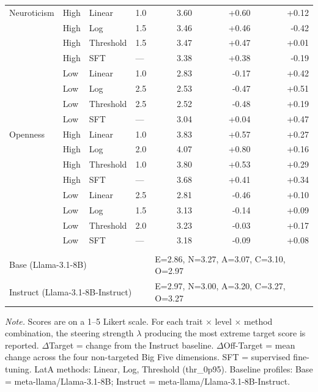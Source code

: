 \begin{table}[htbp]
\begin{threeparttable}
\begin{tabular}{llllrrr}
\addlinespace
  Neuroticism & High & Linear & 1.0 & 3.60 & +0.60 & +0.12 \\
   & High & Log & 1.5 & 3.46 & +0.46 & -0.42 \\
   & High & Threshold & 1.5 & 3.47 & +0.47 & +0.01 \\
   & High & SFT & — & 3.38 & +0.38 & -0.19 \\
   & Low & Linear & 1.0 & 2.83 & -0.17 & +0.42 \\
   & Low & Log & 2.5 & 2.53 & -0.47 & +0.51 \\
   & Low & Threshold & 2.5 & 2.52 & -0.48 & +0.19 \\
   & Low & SFT & — & 3.04 & +0.04 & +0.47 \\
\addlinespace
  Openness & High & Linear & 1.0 & 3.83 & +0.57 & +0.27 \\
   & High & Log & 2.0 & 4.07 & +0.80 & +0.16 \\
   & High & Threshold & 1.0 & 3.80 & +0.53 & +0.29 \\
   & High & SFT & — & 3.68 & +0.41 & +0.34 \\
   & Low & Linear & 2.5 & 2.81 & -0.46 & +0.10 \\
   & Low & Log & 1.5 & 3.13 & -0.14 & +0.09 \\
   & Low & Threshold & 2.0 & 3.23 & -0.03 & +0.17 \\
   & Low & SFT & — & 3.18 & -0.09 & +0.08 \\
\addlinespace
\multicolumn{4}{l}{\textit{Baselines}} \\
  \multicolumn{4}{l}{Base (Llama-3.1-8B)} & \multicolumn{3}{l}{E=2.86, N=3.27, A=3.07, C=3.10, O=2.97} \\
  \multicolumn{4}{l}{Instruct (Llama-3.1-8B-Instruct)} & \multicolumn{3}{l}{E=2.97, N=3.00, A=3.20, C=3.27, O=3.27} \\
\bottomrule
\end{tabular}
\begin{tablenotes}
\small
\item \textit{Note.} Scores are on a 1--5 Likert scale. For each trait $\times$ level $\times$ method combination, the steering strength $\lambda$ producing the most extreme target score is reported. $\Delta$Target = change from the Instruct baseline. $\Delta$Off-Target = mean change across the four non-targeted Big Five dimensions. SFT = supervised fine-tuning. LatA methods: Linear, Log, Threshold (thr\_0p95). Baseline profiles: Base = meta-llama/Llama-3.1-8B; Instruct = meta-llama/Llama-3.1-8B-Instruct.
\end{tablenotes}
\end{threeparttable}
\end{table}